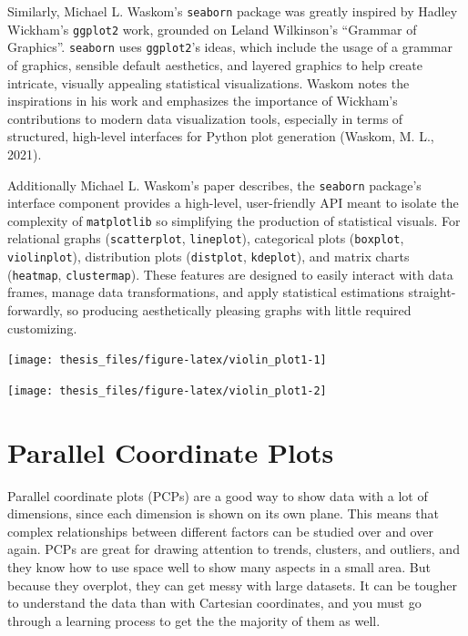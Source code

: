 \documentclass[print]{nuthesis}
\begin{document}
Similarly, Michael L. Waskom's \texttt{seaborn} package was greatly inspired by Hadley Wickham's \texttt{ggplot2} work, grounded on Leland Wilkinson's ``Grammar of Graphics''.
\texttt{seaborn} uses \texttt{ggplot2}'s ideas, which include the usage of a grammar of graphics, sensible default aesthetics, and layered graphics to help create intricate, visually appealing statistical visualizations.
Waskom notes the inspirations in his work and emphasizes the importance of Wickham's contributions to modern data visualization tools, especially in terms of structured, high-level interfaces for Python plot generation (Waskom, M. L., 2021).

Additionally Michael L. Waskom's paper describes, the \texttt{seaborn} package's interface component provides a high-level, user-friendly API meant to isolate the complexity of \texttt{matplotlib} so simplifying the production of statistical visuals.
For relational graphs (\texttt{scatterplot}, \texttt{lineplot}), categorical plots (\texttt{boxplot}, \texttt{violinplot}), distribution plots (\texttt{distplot}, \texttt{kdeplot}), and matrix charts (\texttt{heatmap}, \texttt{clustermap}).
These features are designed to easily interact with data frames, manage data transformations, and apply statistical estimations straight-forwardly, so producing aesthetically pleasing graphs with little required customizing.

\begin{center}\texttt{[image: thesis\_files/figure-latex/violin\_plot1-1]} \end{center}

\begin{center}\texttt{[image: thesis\_files/figure-latex/violin\_plot1-2]} \end{center}

\hypertarget{parallel-coordinate-plots}{%
\section{Parallel Coordinate Plots}\label{parallel-coordinate-plots}}

Parallel coordinate plots (PCPs) are a good way to show data with a lot of dimensions, since each dimension is shown on its own plane.
This means that complex relationships between different factors can be studied over and over again.
PCPs are great for drawing attention to trends, clusters, and outliers, and they know how to use space well to show many aspects in a small area.
But because they overplot, they can get messy with large datasets.
It can be tougher to understand the data than with Cartesian coordinates, and you must go through a learning process to get the the majority of them as well.
\end{document}
